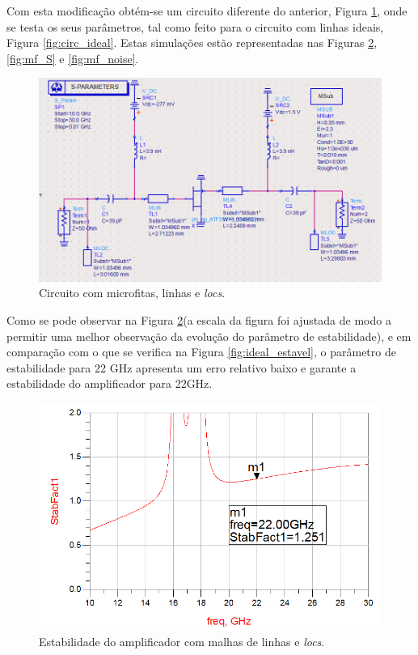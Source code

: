 \documentclass[11pt]{article}
\numberwithin{equation}{section}
\begin{document}
Com esta modificação obtém-se um circuito diferente do anterior, Figura \ref{fig:circuito_mf}, onde se testa os seus parâmetros, tal como feito para o circuito com linhas ideais, Figura \ref{fig:circ_ideal}. Estas simulações estão representadas nas Figuras \ref{fig:mf_est}, \ref{fig:mf_S} e \ref{fig:mf_noise}.

\begin{figure}[H]
	\centering
	\includegraphics[keepaspectratio=true, scale=0.41]{exps/Circuito_mf}
	\vspace{-0.5em}
	\caption{Circuito com microfitas, linhas e \textit{locs}.}
	\vspace{-0.8em}
	\label{fig:circuito_mf}
\end{figure}

Como se pode observar na Figura \ref{fig:mf_est}(a escala da figura foi ajustada de modo a permitir uma melhor observação da evolução do parâmetro de estabilidade), e em comparação com o que se verifica na Figura \ref{fig:ideal_estavel}, o parâmetro de estabilidade para 22 GHz apresenta um erro relativo baixo e garante a estabilidade do amplificador para 22GHz.

\begin{figure}[H]
	\centering
	\includegraphics[keepaspectratio=true, scale=0.41]{exps/mf_estab}
	\vspace{-0.5em}
	\caption{Estabilidade do amplificador com malhas de linhas e \textit{locs}.}
	\vspace{-0.8em}
	\label{fig:mf_est}
\end{figure}
\end{document}
